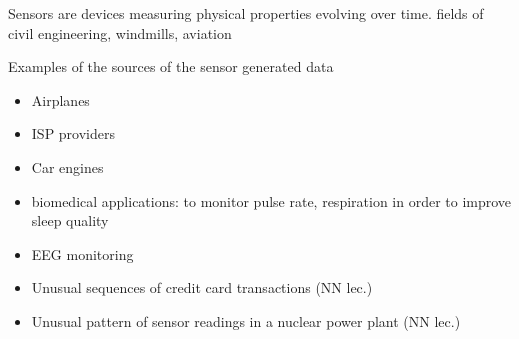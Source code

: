 Sensors are devices measuring physical properties evolving over time.
fields of civil engineering, windmills, aviation 

Examples of the sources of the sensor generated data
\begin{itemize}
	\item Airplanes
	\item ISP providers
	\item Car engines
    \item biomedical applications: to monitor pulse rate, respiration in order to improve sleep quality 
    \item EEG monitoring 
    \item Unusual sequences of credit card transactions (NN lec.)
    \item Unusual pattern of sensor readings in a nuclear power plant (NN lec.)
\end{itemize}
